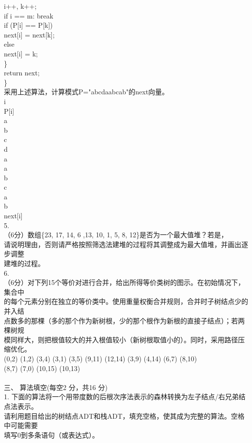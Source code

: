 \begin{question}
i++, k++;\\
if i == m: break\\
if (P[i] == P[k])\\
next[i] = next[k];\\
else\\
next[i] = k;\\
\}\\
return next;\\
\}\\
采用上述算法，计算模式P="abcdaabcab"的next向量。\\
i\\
P[i]\\
a\\
b\\
c\\
d\\
a\\
a\\
b\\
c\\
a\\
b\\
next[i]\\
5.\\
（6分）数组\{23, 17, 14, 6 ,13, 10, 1, 5, 8, 12\}是否为一个最大值堆？若是，\\
请说明理由，否则请严格按照筛选法建堆的过程将其调整成为最大值堆，并画出逐步调整\\
建堆的过程。\\
6.\\
（6分）对下列15个等价对进行合并，给出所得等价类树的图示。在初始情况下，集合中\\
的每个元素分别在独立的等价类中。使用重量权衡合并规则，合并时子树结点少的并入结\\
点数多的那棵（多的那个作为新树根，少的那个根作为新根的直接子结点）；若两棵树规\\
模同样大，则把根值较大的并入根值较小（新树根取值小的）。同时，采用路径压缩优化。\\
(0,2) (1,2) (3,4) (3,1) (3,5) (9,11) (12,14) (3,9) (4,14) (6,7) (8,10)\\
(8,7) (7,0) (10,15) (10,13)\\
\\
三、 算法填空(每空2 分，共16 分)\\
1. 下面的算法将一个用带度数的后根次序法表示的森林转换为左子结点/右兄弟结点法表示。\\
请利用题目给出的树结点ADT和栈ADT，填充空格，使其成为完整的算法。空格中可能需要\\
填写0到多条语句（或表达式）。\\

\end{question}
